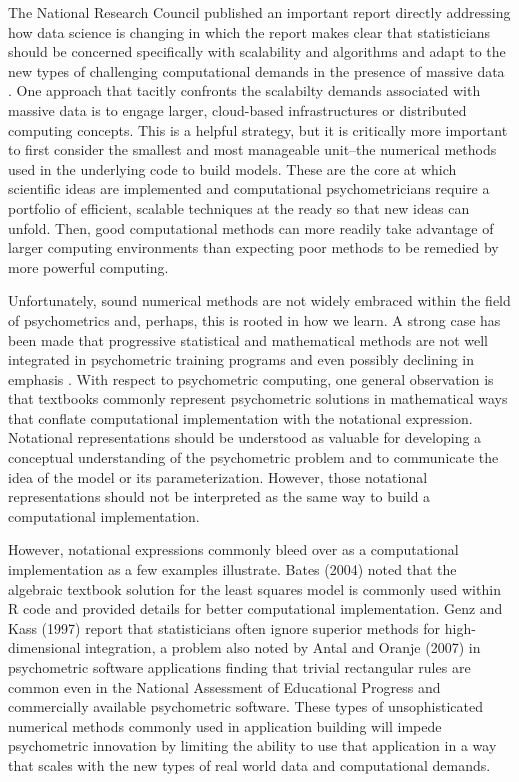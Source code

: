 \documentclass[12pt]{article}
\begin{document}
The National Research Council published an important report directly addressing how data science is changing in which the report makes clear that statisticians should be concerned specifically with scalability and algorithms and adapt to the new types of challenging computational demands in the presence of massive data \cite{massive}. One approach that tacitly confronts the scalabilty demands associated with massive data is to engage larger, cloud-based infrastructures or distributed computing concepts. This is a helpful strategy, but it is critically more important to first consider the smallest and most manageable unit--the numerical methods used in the underlying code to build models. These are the core at which scientific ideas are implemented and computational psychometricians require a portfolio of efficient, scalable techniques at the ready so that new ideas can unfold. Then, good computational methods can more readily take advantage of larger computing environments than expecting poor methods to be remedied by more powerful computing.   

Unfortunately, sound numerical methods are not widely embraced within the field of psychometrics and, perhaps, this is rooted in how we learn. A strong case has been made that progressive statistical and mathematical methods are not well integrated in psychometric training programs and even possibly declining in emphasis \cite{aiken,townsend}. With respect to psychometric computing, one general observation is that textbooks commonly represent psychometric solutions in mathematical ways that conflate computational implementation with the notational expression. Notational representations should be understood as valuable for developing a conceptual understanding of the psychometric problem and to communicate the idea of the model or its parameterization. However, those notational representations should not be interpreted as the same way to build a computational implementation. 

However, notational expressions commonly bleed over as a computational implementation as a few examples illustrate. Bates (2004)\nocite{Rnews:Bates:2004} noted that the algebraic textbook solution for the least squares model is commonly used within R code and provided details for better computational implementation. Genz and Kass (1997) report that statisticians often ignore superior methods for high-dimensional integration, a problem also noted by Antal and Oranje (2007) in psychometric software applications finding that trivial rectangular rules are common even in the National Assessment of Educational Progress \cite{nces} and commercially available psychometric software. These types of unsophisticated numerical methods commonly used in application building will impede psychometric innovation by limiting the ability to use that application in a way that scales with the new types of real world data and computational demands. \nocite{genz, ets:2007}
\end{document}
